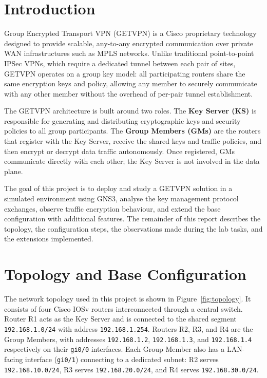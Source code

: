 \documentclass[12pt]{article}
\begin{document}
\section{Introduction}

Group Encrypted Transport VPN (GETVPN) is a Cisco proprietary technology designed to provide scalable, any-to-any encrypted communication over private WAN infrastructures such as MPLS networks. Unlike traditional point-to-point IPSec VPNs, which require a dedicated tunnel between each pair of sites, GETVPN operates on a group key model: all participating routers share the same encryption keys and policy, allowing any member to securely communicate with any other member without the overhead of per-pair tunnel establishment.

The GETVPN architecture is built around two roles. The \textbf{Key Server (KS)} is responsible for generating and distributing cryptographic keys and security policies to all group participants. The \textbf{Group Members (GMs)} are the routers that register with the Key Server, receive the shared keys and traffic policies, and then encrypt or decrypt data traffic autonomously. Once registered, GMs communicate directly with each other; the Key Server is not involved in the data plane.

The goal of this project is to deploy and study a GETVPN solution in a simulated environment using GNS3, analyse the key management protocol exchanges, observe traffic encryption behaviour, and extend the base configuration with additional features. The remainder of this report describes the topology, the configuration steps, the observations made during the lab tasks, and the extensions implemented.

\section{Topology and Base Configuration}

The network topology used in this project is shown in Figure~\ref{fig:topology}. It consists of four Cisco IOSv routers interconnected through a central switch. Router R1 acts as the Key Server and is connected to the shared segment \texttt{192.168.1.0/24} with address \texttt{192.168.1.254}. Routers R2, R3, and R4 are the Group Members, with addresses \texttt{192.168.1.2}, \texttt{192.168.1.3}, and \texttt{192.168.1.4} respectively on their \texttt{gi0/0} interfaces. Each Group Member also has a LAN-facing interface (\texttt{gi0/1}) connecting to a dedicated subnet: R2 serves \texttt{192.168.10.0/24}, R3 serves \texttt{192.168.20.0/24}, and R4 serves \texttt{192.168.30.0/24}.
\end{document}
